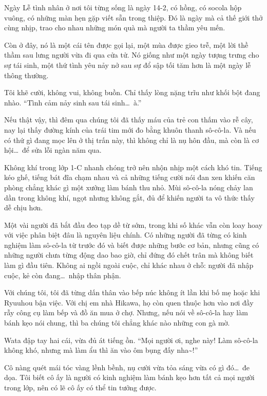 \documentclass[../main.tex]{subfiles}
\begin{document}
Ngày Lễ tình nhân ở nơi tôi từng sống là ngày 14-2, có hồng, có socola hộp vuông, có những màn hẹn gặp viết sẵn trong thiệp. Đó là ngày mà cả thế giới thở cùng nhịp, trao cho nhau những món quà mà người ta thầm yêu mến.

Còn ở đây, nó là một cái tên được gọi lại, một mùa được gieo trễ, một lời thề thầm sau lưng người vừa đi qua cửa tử. Nó giống như một ngày tượng trưng cho sự tái sinh, một thứ tình yêu nảy nở sau sự đổ sập tối tăm hơn là một ngày lễ thông thường.

Tôi khẽ cười, không vui, không buồn. Chỉ thấy lòng nặng trĩu như khối bột đang nhào. ``Tình cảm nảy sinh sau tái sinh\dots\ à.''

Nếu thật vậy, thì đêm qua chúng tôi đã thấy máu của trẻ con thấm vào rễ cây, nay lại thấy đường kính của trái tim mới đo bằng khuôn thanh sô-cô-la. Và nếu có thứ gì đang mọc lên ở thị trấn này, thì không chỉ là nụ hôn đầu, mà còn là cơ hội\dots\ để sửa lỗi ngàn năm qua.

\ct

Không khí trong lớp 1-C nhanh chóng trở nên nhộn nhịp một cách khó tin.
Tiếng kéo ghế, tiếng bát đĩa chạm nhau và cả những tiếng cười nói đan xen khiến căn phòng chẳng khác gì một xưởng làm bánh thu nhỏ. Mùi sô-cô-la nóng chảy lan dần trong không khí, ngọt nhưng không gắt, đủ để khiến người ta vô thức thấy dễ chịu hơn.

Một vài người đã bắt đầu đeo tạp dề từ sớm, trong khi số khác vẫn còn loay hoay với việc phân biệt đâu là nguyên liệu chính. Có những người đã từng có kinh nghiệm làm sô-cô-la từ trước đó và biết được những bước cơ bản, nhưng cũng có những người chưa từng động dao bao giờ, chỉ đứng đó chết trân mà không biết làm gì đầu tiên. Không ai ngồi ngoài cuộc, chỉ khác nhau ở chỗ: người đã nhập cuộc, kẻ còn đang\dots\ nhập thân phận.

Với chúng tôi, tôi đã từng dấn thân vào bếp núc không ít lần khi bố mẹ hoặc khi Ryuuhou bận việc. Với chị em nhà Hikawa, họ còn quen thuộc hơn vào nơi đầy rẫy công cụ làm bếp và đồ ăn mua ở chợ. Nhưng, nếu nói về sô-cô-la hay làm bánh kẹo nói chung, thì ba chúng tôi chẳng khác nào những con gà mờ.

Wata đập tay hai cái, vừa đủ át tiếng ồn. ``Mọi người ơi, nghe này! Làm sô-cô-la không khó, nhưng mà làm ẩu thì ăn vào ôm bụng đấy nha\~{}!''

Cô nàng quét mái tóc vàng lềnh bềnh, nụ cười vừa tỏa sáng vừa có gì đó\dots\ đe dọa. Tôi biết cô ấy là người có kinh nghiệm làm bánh kẹo hơn tất cả mọi người trong lớp, nên có lẽ cô ấy có thể tin tưởng được.
\end{document}
